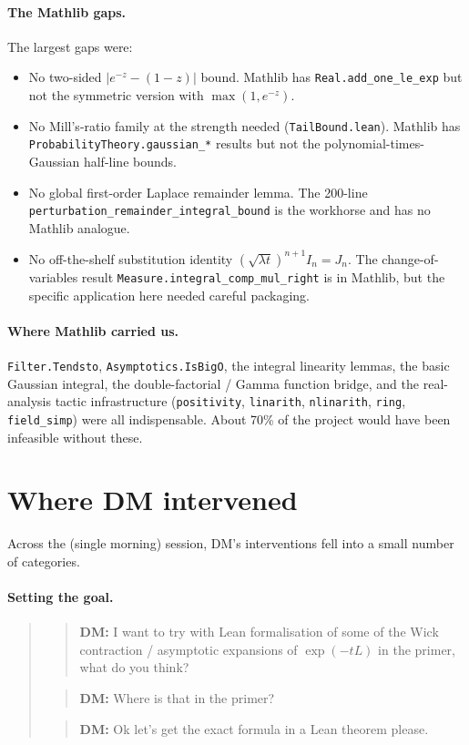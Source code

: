 \documentclass[11pt]{article}
\newcommand{\userbox}[1]{\par\medskip\begin{quote}\small\textbf{\textcolor{blue!60}{DM:}} #1\end{quote}\medskip}
\begin{document}
\paragraph{The Mathlib gaps.} The largest gaps were:
\begin{itemize}
\item No two-sided $|e^{-z} - (1-z)|$ bound. Mathlib has
\texttt{Real.add\_one\_le\_exp} but not the symmetric version with
$\max(1, e^{-z})$.
\item No Mill's-ratio family at the strength needed
(\texttt{TailBound.lean}). Mathlib has \texttt{ProbabilityTheory.gaussian\_*}
results but not the polynomial-times-Gaussian half-line bounds.
\item No global first-order Laplace remainder lemma. The 200-line
\texttt{perturbation\_remainder\_integral\_bound} is the workhorse and
has no Mathlib analogue.
\item No off-the-shelf substitution identity
$(\sqrt{\lambda t})^{n+1} I_n = J_n$. The change-of-variables result
\texttt{Measure.integral\_comp\_mul\_right} is in Mathlib, but the
specific application here needed careful packaging.
\end{itemize}

\paragraph{Where Mathlib carried us.} \texttt{Filter.Tendsto},
\texttt{Asymptotics.IsBigO}, the integral linearity lemmas, the basic
Gaussian integral, the double-factorial / Gamma function bridge, and the
real-analysis tactic infrastructure (\texttt{positivity}, \texttt{linarith},
\texttt{nlinarith}, \texttt{ring}, \texttt{field\_simp}) were all
indispensable. About 70\% of the project would have been infeasible
without these.

\section{Where DM intervened}

Across the (single morning) session, DM's interventions fell into a
small number of categories.

\paragraph{Setting the goal.}
\begin{quote}
\itshape
\userbox{I want to try with Lean formalisation of some of the Wick
contraction / asymptotic expansions of $\exp(-tL)$ in the primer, what
do you think?}

\userbox{Where is that in the primer?}

\userbox{Ok let's get the exact formula in a Lean theorem please.}
\end{quote}
\end{document}
